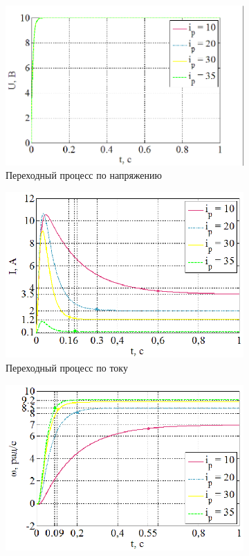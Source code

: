 \documentclass[a4paper,12pt]{article} %
\begin{document}
\begin{figure}[H]
	\centering
	\begin{subfigure}[b]{0.48\textwidth}
	    \includegraphics[width = \textwidth]{scheme/U4}
		\caption{Переходный процесс по напряжению}
	\end{subfigure}
	\hfill
	\begin{subfigure}[b]{0.48\textwidth}
		\includegraphics[width = \textwidth]{scheme/I4}
		\caption{Переходный процесс по току}
	\end{subfigure}
	\begin{subfigure}[b]{0.48\textwidth}
		\includegraphics[width = \textwidth]{scheme/W4}

\end{subfigure}
\end{figure}
\end{document}
